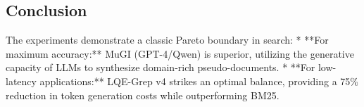 \documentclass[11pt,a4paper]{article}
\begin{document}
\subsection{Conclusion}
The experiments demonstrate a classic Pareto boundary in search:
* **For maximum accuracy:** MuGI (GPT-4/Qwen) is superior, utilizing the generative capacity of LLMs to synthesize domain-rich pseudo-documents.
* **For low-latency applications:** LQE-Grep v4 strikes an optimal balance, providing a 75\% reduction in token generation costs while outperforming BM25.
\end{document}
